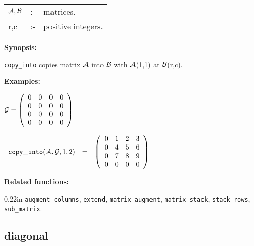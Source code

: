 \hspace*{0.1in}
\begin{tabular}{l l l}
${\cal A,B}$ &:-& matrices. \\
r,c          &:-& positive integers.
\end{tabular}

{\bf Synopsis:} %

\hspace*{0.175in} {\tt copy\_into} copies matrix ${\cal A}$ into
                ${\cal B}$ with ${\cal A}$(1,1) at ${\cal B}$(r,c).

{\bf Examples:}

\begin{flushleft}
\hspace*{0.175in}
\begin{math}
{\cal G} = \left( \begin{array}{cccc} 0 & 0 & 0 & 0 \\ 0 & 0 & 0 & 0 \\
0 & 0 & 0 & 0 \\ 0 & 0 & 0 & 0
\end{array} \right)
\end{math}
\end{flushleft}

\begin{flushleft}
\hspace*{0.1in}
\begin{math}
\begin{array}{ccc}
{\tt copy\_into}({\cal A,G},1,2) & = &
\left( \begin{array}{cccc} 0 & 1 & 2 & 3 \\ 0 & 4 & 5 & 6 \\ 0 & 7 & 8
& 9 \\ 0 & 0 & 0 & 0
\end{array} \right)
\end{array}
\end{math}
\end{flushleft}

{\bf Related functions:}

\begin{addtolength}{\leftskip}{0.22in}
{\tt augment\_columns}, {\tt extend}, {\tt matrix\_augment},
{\tt matrix\_stack}, {\tt stack\_rows}, {\tt sub\_matrix}.

\end{addtolength}


\subsection{diagonal}

